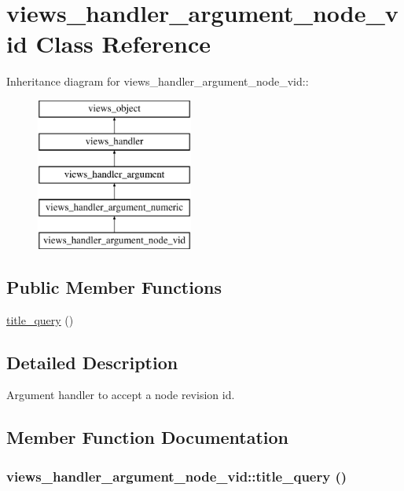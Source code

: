 \hypertarget{classviews__handler__argument__node__vid}{
\section{views\_\-handler\_\-argument\_\-node\_\-vid Class Reference}
\label{classviews__handler__argument__node__vid}
}
Inheritance diagram for views\_\-handler\_\-argument\_\-node\_\-vid::\begin{figure}[H]
\begin{center}
\leavevmode
\includegraphics[height=5cm]{classviews__handler__argument__node__vid}
\end{center}
\end{figure}
\subsection*{Public Member Functions}
\begin{CompactItemize}
\item 
\hyperlink{classviews__handler__argument__node__vid_174a060cd5fb97db7991708db67e8724}{title\_\-query} ()
\end{CompactItemize}


\subsection{Detailed Description}
Argument handler to accept a node revision id. 

\subsection{Member Function Documentation}
\hypertarget{classviews__handler__argument__node__vid_174a060cd5fb97db7991708db67e8724}{
\subsubsection[{title\_\-query}]{\setlength{\rightskip}{0pt plus 5cm}views\_\-handler\_\-argument\_\-node\_\-vid::title\_\-query ()}}
\label{classviews__handler__argument__node__vid_174a060cd5fb97db7991708db67e8724}


